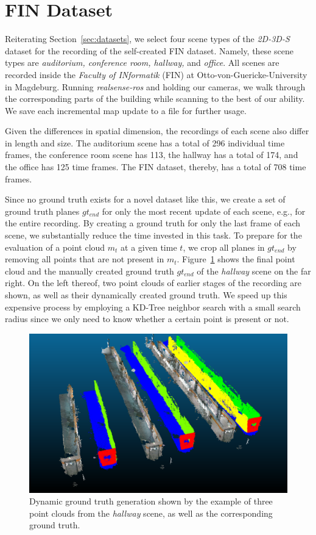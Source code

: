 \documentclass[main.tex]{subfiles}
\begin{document}
\section{FIN Dataset}
\label{sec:finimpl}
Reiterating Section~\ref{sec:datasets}, we select four scene types of the \textit{2D-3D-S} dataset for the recording of the self-created FIN
dataset. Namely, these scene types are \textit{auditorium, conference room, hallway,} and \textit{office}.
All scenes are recorded inside the \textit{Faculty of INformatik} (FIN) at Otto-von-Guericke-University in Magdeburg.
Running \textit{realsense-ros} and holding our cameras, we walk through the corresponding parts of the building while scanning to the best of our ability.
We save each incremental map update to a file for further usage.

Given the differences in spatial dimension, the recordings of each scene also differ in length and size.
The auditorium scene has a total of 296 individual time frames, the conference room scene has 113, the hallway has a total of 174, 
and the office has 125 time frames.
The FIN dataset, thereby, has a total of 708 time frames.

Since no ground truth exists for a novel dataset like this, we create a set of ground truth planes $gt_{end}$ for only the most recent update of each scene, e.g., for the entire recording.
By creating a ground truth for only the last frame of each scene, we substantially reduce the time invested in this task.
To prepare for the evaluation of a point cloud $m_t$ at a given time $t$, we crop all planes in $gt_{end}$ by removing all points that are not present in $m_t$.
Figure~\ref{fig:dynGT} shows the final point cloud and the manually created ground truth $gt_{end}$ of the \textit{hallway} scene on the far right. 
On the left thereof, two point clouds of earlier stages of the recording are shown, as well as their dynamically created ground truth. 
We speed up this expensive process by employing a KD-Tree neighbor search with a small search radius since we only need to know whether a certain point is present or not.

\begin{figure}[H]
    \centering
    \includegraphics[width=15 cm]{images/dynamic_eval.png}
    \caption[Dynamic Ground Truth Generation]{Dynamic ground truth generation shown by the example of three point clouds from the
    \textit{hallway} scene, as well as the corresponding ground truth.}

    \label{fig:dynGT}
\end{figure}
\end{document}
